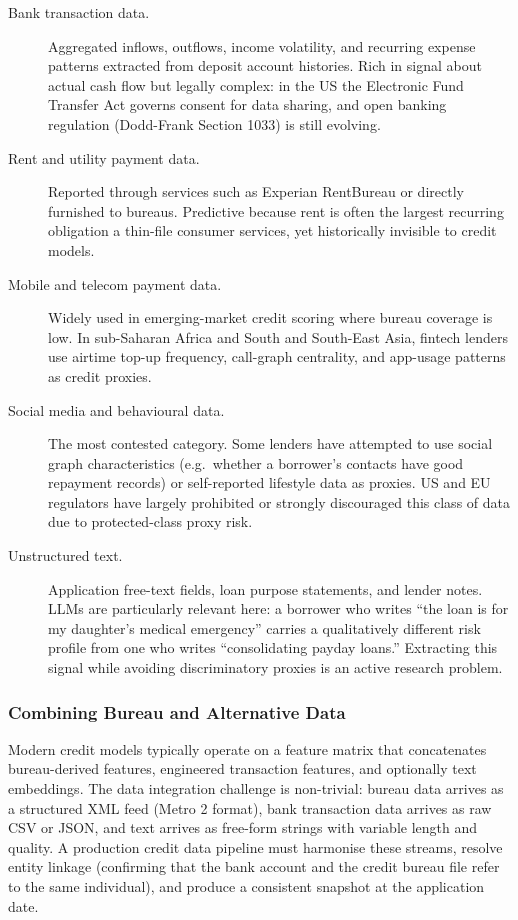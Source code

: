 \begin{context}
\begin{description}
  \item[Bank transaction data.] Aggregated inflows, outflows, income volatility, and recurring expense patterns extracted from deposit account histories. Rich in signal about actual cash flow but legally complex: in the US the Electronic Fund Transfer Act governs consent for data sharing, and open banking regulation (Dodd-Frank Section 1033) is still evolving.

  \item[Rent and utility payment data.] Reported through services such as Experian RentBureau or directly furnished to bureaus. Predictive because rent is often the largest recurring obligation a thin-file consumer services, yet historically invisible to credit models.

  \item[Mobile and telecom payment data.] Widely used in emerging-market credit scoring where bureau coverage is low. In sub-Saharan Africa and South and South-East Asia, fintech lenders use airtime top-up frequency, call-graph centrality, and app-usage patterns as credit proxies.

  \item[Social media and behavioural data.] The most contested category. Some lenders have attempted to use social graph characteristics (e.g.\ whether a borrower's contacts have good repayment records) or self-reported lifestyle data as proxies. US and EU regulators have largely prohibited or strongly discouraged this class of data due to protected-class proxy risk.

  \item[Unstructured text.] Application free-text fields, loan purpose statements, and lender notes. LLMs are particularly relevant here: a borrower who writes ``the loan is for my daughter's medical emergency'' carries a qualitatively different risk profile from one who writes ``consolidating payday loans.'' Extracting this signal while avoiding discriminatory proxies is an active research problem.
\end{description}

\subsubsection*{Combining Bureau and Alternative Data}

Modern credit models typically operate on a feature matrix that concatenates bureau-derived features, engineered transaction features, and optionally text embeddings. The data integration challenge is non-trivial: bureau data arrives as a structured XML feed (Metro 2 format), bank transaction data arrives as raw CSV or JSON, and text arrives as free-form strings with variable length and quality. A production credit data pipeline must harmonise these streams, resolve entity linkage (confirming that the bank account and the credit bureau file refer to the same individual), and produce a consistent snapshot at the application date.


\end{context}
